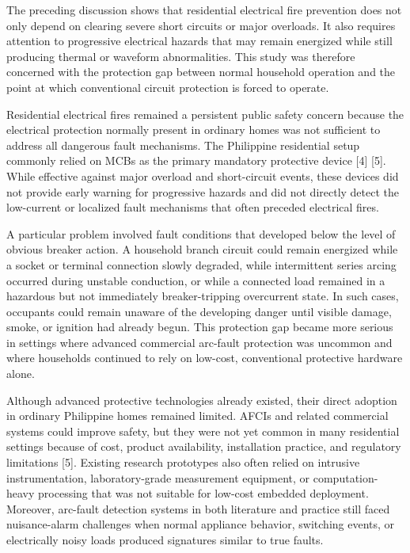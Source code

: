 The preceding discussion shows that residential electrical fire
prevention does not only depend on clearing severe short circuits or
major overloads. It also requires attention to progressive electrical
hazards that may remain energized while still producing thermal or
waveform abnormalities. This study was therefore concerned with the
protection gap between normal household operation and the point at which
conventional circuit protection is forced to operate.

Residential electrical fires remained a persistent public safety concern
because the electrical protection normally present in ordinary homes was
not sufficient to address all dangerous fault mechanisms. The Philippine
residential setup commonly relied on MCBs as the primary mandatory
protective device {[}4{]} {[}5{]}. While effective against major
overload and short-circuit events, these devices did not provide early
warning for progressive hazards and did not directly detect the
low-current or localized fault mechanisms that often preceded electrical
fires.

A particular problem involved fault conditions that developed below the
level of obvious breaker action. A household branch circuit could remain
energized while a socket or terminal connection slowly degraded, while
intermittent series arcing occurred during unstable conduction, or while
a connected load remained in a hazardous but not immediately
breaker-tripping overcurrent state. In such cases, occupants could
remain unaware of the developing danger until visible damage, smoke, or
ignition had already begun. This protection gap became more serious in
settings where advanced commercial arc-fault protection was uncommon and
where households continued to rely on low-cost, conventional protective
hardware alone.

Although advanced protective technologies already existed, their direct
adoption in ordinary Philippine homes remained limited. AFCIs and
related commercial systems could improve safety, but they were not yet
common in many residential settings because of cost, product
availability, installation practice, and regulatory limitations {[}5{]}.
Existing research prototypes also often relied on intrusive
instrumentation, laboratory-grade measurement equipment, or
computation-heavy processing that was not suitable for low-cost embedded
deployment. Moreover, arc-fault detection systems in both literature and
practice still faced nuisance-alarm challenges when normal appliance
behavior, switching events, or electrically noisy loads produced
signatures similar to true faults.


